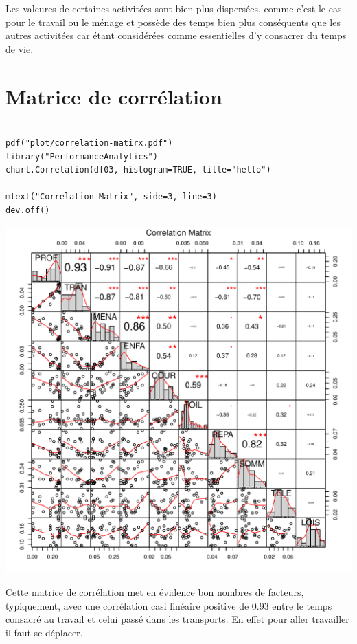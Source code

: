 \documentclass[11pt]{article}
\begin{document}
Les valeures de certaines activitées sont bien plus dispersées, comme c'est le cas pour le travail ou le ménage et possède des temps bien plus conséquents que les autres activitées car étant considérées comme essentielles d'y consacrer du temps de vie.


\newpage

\section{Matrice de corrélation}

\begin{verbatim}

pdf("plot/correlation-matirx.pdf")
library("PerformanceAnalytics")
chart.Correlation(df03, histogram=TRUE, title="hello")

mtext("Correlation Matrix", side=3, line=3)
dev.off()

\end{verbatim}


\includegraphics[scale=0.8]{../plot/correlation-matirx.pdf}


Cette matrice de corrélation met en évidence bon nombres de facteurs, typiquement, avec une corrélation casi linéaire positive de 0.93 entre le temps consacré au travail et celui passé dans les transports. En effet pour aller travailler il faut se déplacer. 
\end{document}

